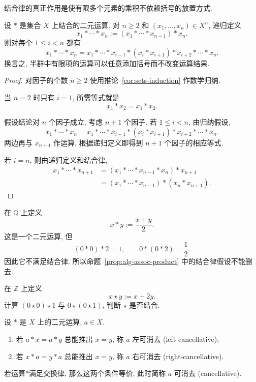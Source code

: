 \documentclass[usesamecnt, thmcnt=section, lang=cn, newtx, 10pt, scheme=chinese]{elegantbook}
\begin{document}
结合律的真正作用是使有限多个元素的乘积不依赖括号的放置方式.

\begin{proposition}\label{prop:alg-assoc-product}
设 $*$ 是集合 $X$ 上结合的二元运算. 对 $n\geq2$ 和 $(x_1,\ldots,x_n)\in X^n$, 递归定义
\[
 x_1*\cdots*x_n:=(x_1*\cdots*x_{n-1})*x_n.
\]
则对每个 $1\leq i<n$ 都有
\[
 x_1*\cdots*x_n
 =x_1*\cdots*x_{i-1}*(x_i*x_{i+1})*x_{i+2}*\cdots*x_n.
\]
换言之, 半群中有限项的运算可以任意添加括号而不改变运算结果.
\end{proposition}

\begin{proof}
对因子的个数 $n\geq2$ 使用推论~\ref{cor:sets-induction} 作数学归纳.

当 $n=2$ 时只有 $i=1$, 所需等式就是
\[
 x_1*x_2=x_1*x_2.
\]

假设结论对 $n$ 个因子成立, 考虑 $n+1$ 个因子. 若 $1\leq i<n$, 由归纳假设,
\[
 x_1*\cdots*x_n
 =x_1*\cdots*x_{i-1}*(x_i*x_{i+1})*x_{i+2}*\cdots*x_n.
\]
两边再与 $x_{n+1}$ 作运算, 根据递归定义即得到 $n+1$ 个因子的相应等式.

若 $i=n$, 则由递归定义和结合律,
\[
 \begin{aligned}
 x_1*\cdots*x_{n+1}
 &= (x_1*\cdots*x_{n-1}*x_n)*x_{n+1}\\
 &= (x_1*\cdots*x_{n-1})*(x_n*x_{n+1}).
 \end{aligned}
\]
\end{proof}

\begin{instance}
在 $\mathbb Q$ 上定义
\[
 x*y:=\frac{x+y}{2}.
\]
这是一个二元运算, 但
\[
 (0*0)*2=1,
 \qquad
 0*(0*2)=\frac12.
\]
因此它不满足结合律. 所以命题~\ref{prop:alg-assoc-product} 中的结合律假设不能删去.
\end{instance}

\begin{exercise}\label{ex:alg-assoc-necessity}
在 $\mathbb Z$ 上定义
\[
 x\star y:=x+2y.
\]
计算 $(0\star0)\star1$ 与 $0\star(0\star1)$, 判断 $\star$ 是否结合.
\end{exercise}

\begin{definition}[消去性]\label{def:alg-cancellative}
设 $*$ 是 $X$ 上的二元运算, $a\in X$.
\begin{enumerate}[label=\rm(\arabic*)]
  \item 若 $a*x=a*y$ 总能推出 $x=y$, 称 $a$ {\color{blue}左可消去 (left-cancellative)};
  \item 若 $x*a=y*a$ 总能推出 $x=y$, 称 $a$ {\color{blue}右可消去 (right-cancellative)}.
\end{enumerate}
若运算$*$满足交换律, 那么这两个条件等价, 此时简称 $a$ {\color{blue}可消去 (cancellative)}.
\end{definition}
\end{document}
